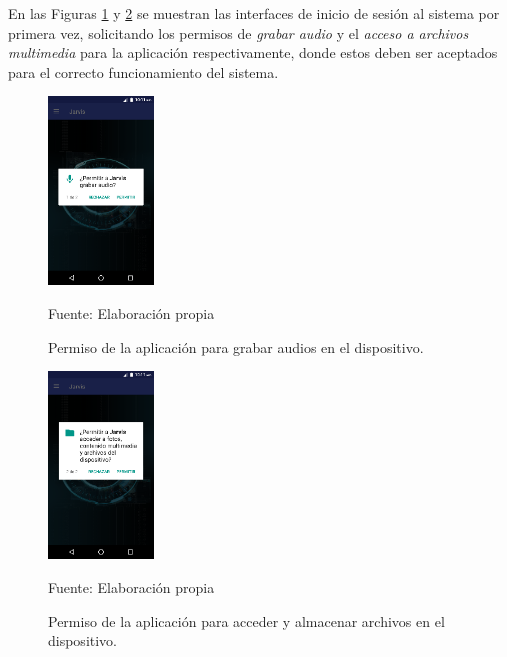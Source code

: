 En las Figuras \ref{fig:figura3.37} y \ref{fig:figura3.38} se muestran las interfaces de inicio de sesión al sistema por primera vez, solicitando los permisos de \textit{grabar audio} y el \textit{acceso a archivos multimedia} para la aplicación respectivamente, donde estos deben ser aceptados para el correcto funcionamiento del sistema.
\begin{figure}[H]
\captionsetup{justification=centering}
\begin{center}
\includegraphics[width=0.25\textwidth]{Imagenes/Cap3/image037}
\end{center}
\begin{center}
\vskip -0.5cm
\caption{\small{Permiso de la aplicación para grabar audios en el dispositivo.}}
\label{fig:figura3.37}
{\small{Fuente: Elaboración propia}}
\end{center}
\end{figure}

\begin{figure}[H]
\captionsetup{justification=centering}
\begin{center}
\includegraphics[width=0.25\textwidth]{Imagenes/Cap3/image038}
\end{center}
\begin{center}
\vskip -0.5cm
\caption{\small{Permiso de la aplicación para acceder y almacenar archivos en el dispositivo.}}
\label{fig:figura3.38}
{\small{Fuente: Elaboración propia}}
\end{center}
\end{figure}

